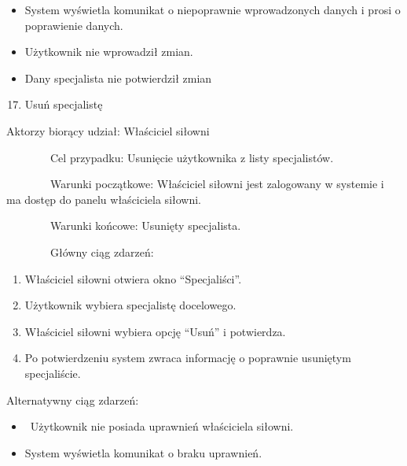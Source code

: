 \documentclass[
]{article}
\providecommand{\tightlist}{%
  \setlength{\itemsep}{0pt}\setlength{\parskip}{0pt}}
\begin{document}
\begin{itemize}
\tightlist
\item
  {System wyświetla komunikat o niepoprawnie wprowadzonych danych i
  prosi o poprawienie danych.}
\end{itemize}

\begin{itemize}
\tightlist
\item
  {Użytkownik nie wprowadził zmian.}
\item
  {Dany specjalista nie potwierdził zmian}
\end{itemize}

{\hfill\break
}

\begin{enumerate}
\setcounter{enumi}{16}
\tightlist
\item
  {Usuń specjalistę}
\end{enumerate}

{Aktorzy biorący udział: Właściciel siłowni}

{~~~~~~~~Cel przypadku: Usunięcie użytkownika z listy specjalistów.}

{~~~~~~~~Warunki początkowe: Właściciel siłowni jest zalogowany w
systemie i ma dostęp do panelu właściciela siłowni.}

{~~~~~~~~Warunki końcowe: Usunięty specjalista.}

{~~~~~~~~Główny ciąg zdarzeń:}

\begin{enumerate}
\tightlist
\item
  {Właściciel siłowni otwiera okno ``Specjaliści''.}
\item
  {Użytkownik wybiera specjalistę docelowego.}
\item
  {Właściciel siłowni wybiera opcję ``Usuń'' i potwierdza.}
\item
  {Po potwierdzeniu system zwraca informację o poprawnie usuniętym
  specjaliście.}
\end{enumerate}

{Alternatywny ciąg zdarzeń:}

\begin{itemize}
\tightlist
\item
  {~Użytkownik nie posiada uprawnień właściciela siłowni.}
\end{itemize}

\begin{itemize}
\tightlist
\item
  {System wyświetla komunikat o braku uprawnień.}
\end{itemize}
\end{document}

